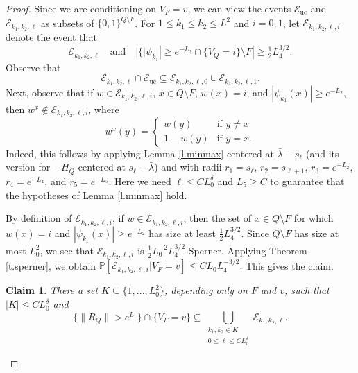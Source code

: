 \documentclass{amsart}
\newtheorem{claim}[equation]{Claim}
\newcommand{\tref}[1]{Theorem \ref{t.#1}}
\newcommand{\lref}[1]{Lemma \ref{l.#1}}
\numberwithin{equation}{section}
\numberwithin{figure}{section}
\renewcommand{\P}{\mathbb{P}}
\begin{document}
\begin{proof}
Since we are conditioning on $V_F = v$, we can view the events $\mathcal E_{\mathrm{uc}}$ and $\mathcal E_{k_1, k_2, \ell}$ as subsets of $\{ 0, 1 \}^{Q \setminus F}$.  For $1 \leq k_1 \leq k_2 \leq L^2$ and $i = 0, 1$, let $\mathcal E_{k_1,k_2,\ell,i}$ denote the event that
\begin{equation*}
\mathcal E_{k_1,k_2,\ell} \quad \mbox{and} \quad |\{ |\psi_{k_1}| \geq e^{-L_2} \cap \{ V_Q = i \} \setminus F| \geq \tfrac12 L_4^{3/2}.
\end{equation*}
Observe that
\begin{equation*}
\mathcal E_{k_1,k_2,\ell} \cap \mathcal E_{\mathrm{uc}} \subseteq \mathcal E_{k_1,k_2,\ell,0} \cup \mathcal E_{k_1,k_2,\ell,1}.
\end{equation*}
Next, observe that if $w \in \mathcal E_{k_1,k_2,\ell,i}$, $x \in Q \setminus F$, $w(x) = i$, and $|\psi_{k_1}(x)| \geq e^{-L_2}$, then $w^x \notin \mathcal E_{k_1,k_2,\ell,i}$, where
\begin{equation*}
w^x(y) = \begin{cases} w(y) & \mbox{if } y \neq x \\ 1-w(y) & \mbox{if } y = x. \end{cases}
\end{equation*}
Indeed, this follows by applying \lref{minmax} centered at $\bar \lambda - s_\ell$ (and its version for $-H_Q$ centered at $s_\ell - \bar \lambda$) and with radii $r_1 = s_\ell$, $r_2 = s_{\ell+1}$, $r_3 = e^{-L_2}$, $r_4 = e^{-L_4}$, and $r_5 = e^{-L_5}$.  Here we need $\ell \leq C L_0^{ \delta}$ and $L_5 \geq C$ to guarantee that the hypotheses of \lref{minmax} hold.

By definition of $\mathcal E_{k_1,k_2,\ell,i}$, if $w \in \mathcal E_{k_1,k_2,\ell,i}$, then the set of $x \in Q \setminus F$ for which $w(x) = i$ and $|\psi_{k_1}(x)| \geq e^{-L_2}$ has size at least $\tfrac12 L_4^{3/2}$.  Since $Q \setminus F$ has size at most $L_0^2$, we see that $\mathcal E_{k_1,k_2,\ell,i}$ is $\tfrac12 L_0^{-2} L_4^{3/2}$-Sperner.  Applying \tref{sperner}, we obtain $\P[\mathcal E_{k_1,k_2,\ell,i} | V_F = v] \leq C L_0 L_4^{-3/2}.$  This gives the claim.

\begin{claim}
There a set $K \subseteq \{ 1, ..., L_0^2 \}$, depending only on $F$ and $v$, such that $|K| \leq C L_0^{\delta}$ and
\begin{equation*}
\{ \| R_Q \| > e^{L_1} \} \cap \{ V_F = v \} \subseteq \bigcup_{\substack{k_1, k_2 \in K \\ 0 \leq \ell \leq C L_0^{\delta}}} \mathcal E_{k_1,k_2,\ell}.
\end{equation*}
\end{claim}


\end{proof}
\end{document}
